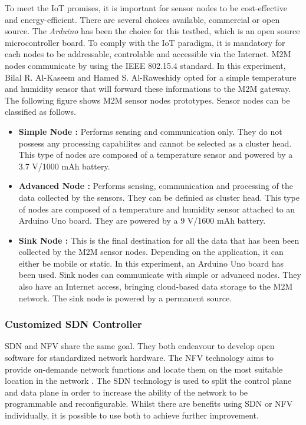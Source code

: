 \documentclass[10pt,journal,compsoc]{IEEEtran}
\begin{document}
To meet the IoT promises, it is important for sensor nodes to be 
cost-effective and energy-efficient. There are several choices available, 
commercial or open source. The \textit{Arduino} \cite{arduino} has been 
the choice for this testbed, which is an open source microcontroller board. 
To comply with the IoT paradigm, it is mandatory for each nodes to be 
addressable, controlable and accessible via the Internet. M2M nodes 
communicate by using the IEEE 802.15.4 standard. In this 
experiment, Bilal R. Al-Kaseem and Hamed S. Al-Raweshidy \cite{main} 
opted for a simple temperature and humidity sensor that will forward these 
informations to the M2M gateway. The following figure shows M2M sensor 
nodes prototypes. Sensor nodes can be classified as follows.
\begin{itemize}
    \item \textbf{Simple Node :} Performs sensing and communication only. 
    They do not possess any processing capabilites and cannot be 
    selected as a cluster head. This type of nodes are composed of a 
    temperature sensor and powered by a 3.7 V/1000 mAh battery. 
    \item \textbf{Advanced Node :} Performs sensing, communication and 
    processing of the data collected by the sensors. They can be 
    definied as cluster head. This type of nodes are composed of a 
    temperature and humidity sensor attached to an Arduino Uno board. 
    They are powered by a 9 V/1600 mAh battery.
    \item \textbf{Sink Node :} This is the final destination for all the 
    data that has been been collected by the M2M sensor nodes. Depending 
    on the application, it can either be mobile or static. In this 
    experiment, an Arduino Uno board has been used. Sink nodes can 
    communicate with simple or advanced nodes. They also have an 
    Internet access, bringing cloud-based data storage to the M2M 
    network. The sink node is powered by a permanent source.
\end{itemize}

\subsubsection{Customized SDN Controller}

SDN and NFV share the same goal. They both endeavour to develop open 
software for standardized network hardware. The NFV technology aims to 
provide on-demande network functions and locate them on the most 
suitable location in the network \cite{batalle}. 
The SDN technology is used to split the control plane and data plane 
in order to increase the ability of the network to be programmable 
and reconfigurable. Whilst there are benefits using SDN or NFV 
individually, it is possible to use both to achieve further improvement. 
\end{document}
